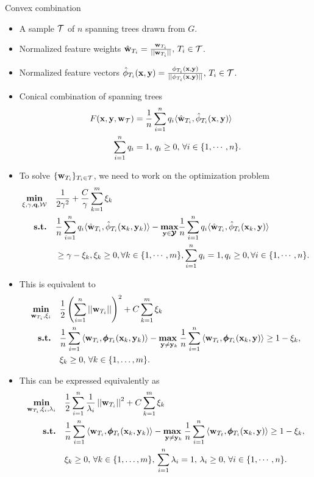 \documentclass[first=dgreen,second=purple,logo=yellowexc]{aaltoslides}
\begin{document}
%
\begin{frame}[allowframebreaks]{Convex combination}
	\begin{itemize}\footnotesize
		\item A sample $\mathcal{T}$ of $n$ spanning trees drawn from $G$.
		\item Normalized feature weights $\hat{\mathbf {w}}_{T_i}=\frac{\mathbf {w}_{T_i}}{||\mathbf {w}_{T_i}||}, \, T_i\in\mathcal{T}$.
		\item Normalized feature vectors $\hat{\phi}_{T_i}(\mathbf {x},\mathbf {y})=\frac{\phi_{T_i}(\mathbf {x},\mathbf {y})}{||\phi_{T_i}(\mathbf {x},\mathbf {y})||}, \, T_i\in\mathcal{T}$.
		\item Conical combination of spanning trees
		\begin{align*}
			F(\mathbf {x},\mathbf {y},\mathbf {w}_{\mathcal{T}}) &= \frac{1}{{n}}\sum_{i=1}^{n}q_i\langle \hat{\mathbf {w}}_{T_i}, \hat{\phi}_{T_i}(\mathbf {x},\mathbf {y}) \rangle\\
			\sum_{i=1}^{n}q_i &= 1,\, q_i \ge 0,\, \forall i\in\{1,\cdots,n\}.
		\end{align*}
		\item To solve $\{\mathbf {w}_{T_i}\}_{T_i\in\mathcal{T}}$, we need to work on the optimization problem
		\begin{align*}
			\underset{\mathbf{\xi},\gamma,\mathbf {q},\mathcal{W}}{\textbf{min}} \quad& \frac{1}{2\gamma^2} + \frac{C}{\gamma}\sum_{k=1}^m\xi_k\\
			\textbf{s.t.} \quad& \frac{1}{{n}}\sum_{i=1}^{n}q_i\langle \hat{\mathbf {w}}_{T_i}, \hat{\phi}_{T_i}(\mathbf {x}_k,\mathbf {y}_k) \rangle -\underset{\mathbf {y}\in\pmb {\mathcal{Y}}}{\textbf{max}}\frac{1}{{n}}\sum_{i=1}^{n}q_i\langle \hat{\mathbf {w}}_{T_i}, \hat{\phi}_{T_i}(\mathbf {x}_k,\mathbf {y}) \rangle\\
			&\ge \gamma-\xi_k, \xi_k\ge 0,\forall k\in\{1,\cdots,m\},\sum_{i=1}^nq_i=1,q_i\ge0,\forall i\in\{1,\cdots,n\}.
		\end{align*}
		\item This is equivalent to
		\begin{align*}
			\underset{\mathbf {w}_{T_i},\xi_i}{\textbf{min}} & \quad \frac{1}{2}\left(\sum_{i=1}^{n}\left|\left| \mathbf {w}_{T_i} \right|\right|\right)^2 + C\sum_{k=1}^{m}\xi_k\\
			\textbf{s.t.} & \quad \frac{1}{{n}}\sum_{i=1}^{n}{ \langle \mathbf {w}_{T_i}, \pmb \phi_{T_t}(\mathbf {x}_k,\mathbf {y}_k) \rangle} - \underset{\mathbf {y} \neq \mathbf {y}_k}{\textbf{max}\ } \frac{1}{{n}}\sum_{i=1}^{n}{\langle \mathbf {w}_{T_t}, \pmb \phi_{T_i}(\mathbf {x}_k,\mathbf {y}) \rangle } \geq 1 -  \xi_k, \\
			& \quad \xi_k\ge0,\, \forall k \in \{ 1,\dots,m \}.
		\end{align*}
		\item This can be expressed equivalently as
		\begin{align*}
			\underset{\mathbf {w}_{T_i},\xi_i,\lambda_i}{\textbf{min}} & \quad \frac{1}{2}\sum_{i=1}^{n}\frac{1}{\lambda_{i}}\left|\left| \mathbf {w}_{T_i} \right|\right|^2 + C\sum_{k=1}^{m}\xi_k\\
			\textbf{s.t.} & \quad \frac{1}{{n}}\sum_{i=1}^{n}{ \langle \mathbf {w}_{T_i}, \pmb \phi_{T_t}(\mathbf {x}_k,\mathbf {y}_k) \rangle} - \underset{\mathbf {y} \neq \mathbf {y}_k}{\textbf{max}\ } \frac{1}{{n}}\sum_{i=1}^{n}{\langle \mathbf {w}_{T_t}, \pmb \phi_{T_i}(\mathbf {x}_k,\mathbf {y}) \rangle } \geq 1 -  \xi_k, \\
			& \quad \xi_k\ge0,\, \forall k \in \{ 1,\dots,m \},\, \sum_{i=1}^{n}\lambda_i=1,\,\lambda_i\ge0,\,\forall i\in\{1,\cdots,n\}.
		\end{align*}
	\end{itemize}
\end{frame}
\end{document}
